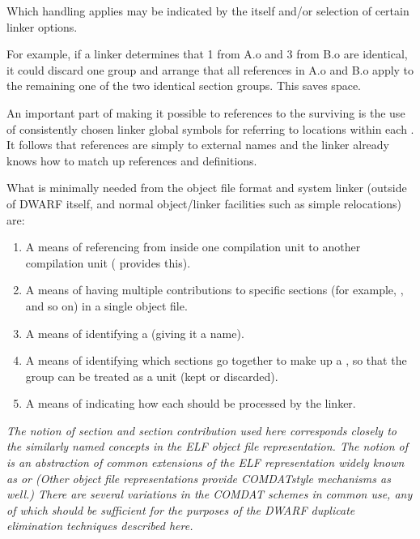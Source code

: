 Which handling applies may be indicated by the 
itself and/or selection of certain linker options.

For example, if a linker determines that 
 1
from A.o and 
 3 from B.o are identical, it could
discard one group and arrange that all references in A.o and
B.o apply to the remaining one of the two identical section
groups. This saves space.

An important part of making it possible to 
references to the surviving 
 is the use of
consistently chosen linker global symbols for referring to
locations within each 
.
It follows that references
are simply to external names and the linker already knows
how to match up references and definitions.

What is minimally needed from the object file format and system
linker (outside of DWARF itself, and normal object/linker
facilities such as simple relocations) are:
\begin{enumerate}[1. ]

\item A means of referencing from inside one \dotdebuginfo{}
compilation unit to another 
\dotdebuginfo{} compilation unit
( provides this).

\item A means of having multiple contributions to specific sections
(for example, \dotdebuginfo{}, and so on) in a single object file.

\item  A means of identifying a  (giving it a name).

\item A means of identifying which sections go together to make
up a , 
so that the group can be treated as a unit
(kept or discarded).

\item  A means of indicating how each  should be
processed by the linker.

\end{enumerate}

\textit{The notion of section and section contribution used here
corresponds closely to the similarly named concepts in the
ELF object file representation. 
The notion of  is
an abstraction of common extensions of the ELF representation
widely known as  or  (Other
object file representations provide COMDAT\dash style mechanisms as
well.) There are several variations in the COMDAT schemes in
common use, any of which should be sufficient for the purposes
of the 
DWARF duplicate elimination techniques described here.}

